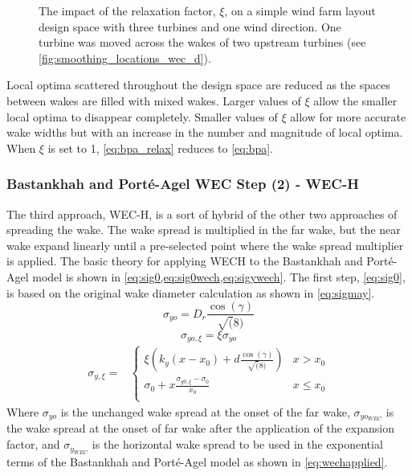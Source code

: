 \documentclass[a4paper]{jpconf}
\begin{document}
\begin{figure}[ht]
\begin{minipage}[t]{0.52\textwidth}
		\caption{The impact of the relaxation factor, $\xi$, on a simple wind farm layout design space with three turbines and one wind direction. One turbine was moved across the wakes of two upstream turbines (see \cref{fig:smoothing_locations_wec_d}). }
		\label{fig:smoothing_bpa_wec_d}
	\end{minipage} 
\end{figure}
%

Local optima scattered throughout the design space are reduced as the spaces between wakes are filled with mixed wakes. Larger values of $\xi$ allow the smaller local optima to disappear completely. Smaller values of $\xi$ allow for more accurate wake widths but with an increase in the number and magnitude of local optima. When $\xi$ is set to 1, \cref{eq:bpa_relax} reduces to \cref{eq:bpa}.

\subsubsection{Bastankhah and Port\'e-Agel WEC Step (2) - WEC-H}

The third approach, WEC-H, is a sort of hybrid of the other two approaches of spreading the wake. The wake spread is multiplied in the far wake, but the near wake expand linearly until a pre-selected point where the wake spread multiplier is applied. The basic theory for applying WECH to the Bastankhah and Port\'{e}-Agel model is shown in \cref{eq:sig0,eq:sig0wech,eq:sigywech}. The first step, \cref{eq:sig0}, is based on the original wake diameter calculation as shown in \cref{eq:sigmay}.
%
\begin{equation}\label{eq:sig0}
\sigma_{yo} = D_r\frac{\cos(\gamma)}{\sqrt(8)}
\end{equation}
%
\begin{equation}\label{eq:sig0wech}
\sigma_{yo,\xi} = \xi \sigma_{yo}
\end{equation}
%
\begin{align}\label{eq:sigywech}
\sigma_{y,\xi} = &
\begin{cases}
\xi (k_y (x-x_0) + d \frac{\cos(\gamma)}{\sqrt(8)}) & x > x_0 \\
\sigma_0 + x \frac{\sigma_{y0,\xi}-\sigma_0}{x_0} & x \le x_0 \\
\end{cases}
\end{align}
%
Where $\sigma_{yo}$ is the unchanged wake spread at the onset of the far wake, $\sigma_{yo_{WEC}}$ is the wake spread at the onset of far wake after the application of the expansion factor, and $\sigma_{y_{WEC}}$ is the horizontal wake spread to be used in the exponential terms of the Bastankhah and Port\'{e}-Agel model as shown in \cref{eq:wechapplied}.
\end{document}
